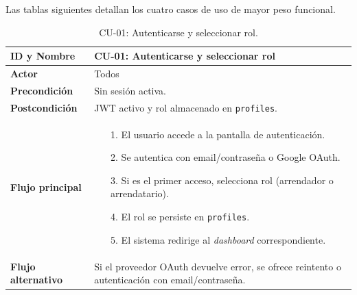 Las tablas siguientes detallan los cuatro casos de uso de mayor peso funcional.

\begin{table}[htbp]
\centering
\caption{CU-01: Autenticarse y seleccionar rol.}
\label{tab:cu-01}
\begin{tabularx}{\textwidth}{|>{\columncolor{gray!15}\bfseries}l|X|}
\hline
ID y Nombre    & CU-01: Autenticarse y seleccionar rol \\ \hline
Actor          & Todos \\ \hline
Precondición   & Sin sesión activa. \\ \hline
Postcondición  & JWT activo y rol almacenado en \texttt{profiles}. \\ \hline
Flujo principal &
\begin{itemize}[leftmargin=3mm, itemsep=0mm, topsep=1mm]
\item[1.] El usuario accede a la pantalla de autenticación.
\item[2.] Se autentica con email/contraseña o Google OAuth.
\item[3.] Si es el primer acceso, selecciona rol (arrendador o arrendatario).
\item[4.] El rol se persiste en \texttt{profiles}.
\item[5.] El sistema redirige al \textit{dashboard} correspondiente.
\end{itemize} \\ \hline
Flujo alternativo & Si el proveedor OAuth devuelve error, se ofrece reintento o autenticación con email/contraseña. \\ \hline
\end{tabularx}
\end{table}

